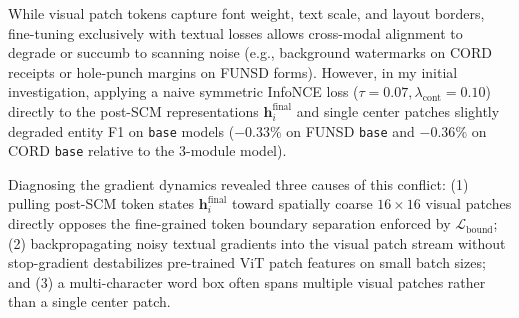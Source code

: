 While visual patch tokens capture font weight, text scale, and layout borders, fine-tuning exclusively with textual losses allows cross-modal alignment to degrade or succumb to scanning noise (e.g., background watermarks on CORD receipts or hole-punch margins on FUNSD forms). However, in my initial investigation, applying a naive symmetric InfoNCE loss ($\tau = 0.07, \lambda_{\text{cont}} = 0.10$) directly to the post-SCM representations $\mathbf{h}_i^{\text{final}}$ and single center patches slightly degraded entity F1 on \texttt{base} models ($-0.33\%$ on FUNSD \texttt{base} and $-0.36\%$ on CORD \texttt{base} relative to the 3-module model).

Diagnosing the gradient dynamics revealed three causes of this conflict: (1) pulling post-SCM token states $\mathbf{h}_i^{\text{final}}$ toward spatially coarse $16 \times 16$ visual patches directly opposes the fine-grained token boundary separation enforced by $\mathcal{L}_{\text{bound}}$; (2) backpropagating noisy textual gradients into the visual patch stream without stop-gradient destabilizes pre-trained ViT patch features on small batch sizes; and (3) a multi-character word box often spans multiple visual patches rather than a single center patch.

